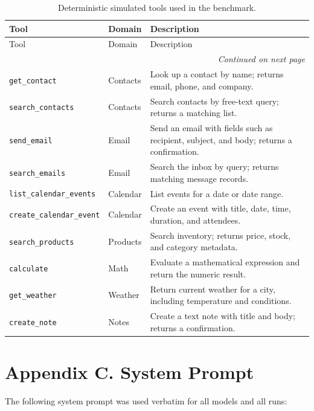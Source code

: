 \documentclass[letterpaper]{article}
\begin{document}
\small
\begin{longtable}{@{}llp{}@{}}
\caption{Deterministic simulated tools used in the benchmark.}\label{tab:tools}\\
\toprule
Tool & Domain & Description \\
\midrule
\endfirsthead
\toprule
Tool & Domain & Description \\
\midrule
\endhead
\midrule
\multicolumn{3}{r}{\textit{Continued on next page}} \\
\endfoot
\bottomrule
\endlastfoot
\texttt{get\_contact}            & Contacts & Look up a contact by name; returns email, phone, and company. \\
\texttt{search\_contacts}        & Contacts & Search contacts by free-text query; returns a matching list. \\
\texttt{send\_email}             & Email    & Send an email with fields such as recipient, subject, and body; returns a confirmation. \\
\texttt{search\_emails}          & Email    & Search the inbox by query; returns matching message records. \\
\texttt{list\_calendar\_events}  & Calendar & List events for a date or date range. \\
\texttt{create\_calendar\_event} & Calendar & Create an event with title, date, time, duration, and attendees. \\
\texttt{search\_products}        & Products & Search inventory; returns price, stock, and category metadata. \\
\texttt{calculate}               & Math     & Evaluate a mathematical expression and return the numeric result. \\
\texttt{get\_weather}            & Weather  & Return current weather for a city, including temperature and conditions. \\
\texttt{create\_note}            & Notes    & Create a text note with title and body; returns a confirmation. \\
\end{longtable}
\normalsize

\clearpage
\section*{Appendix C. System Prompt}
\label{app:system_prompt}

The following system prompt was used verbatim for all models and all runs:
\end{document}
